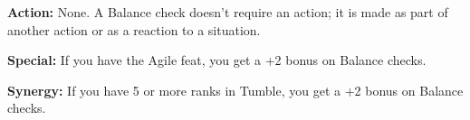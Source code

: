 \textbf{Action:} None. A Balance check doesn’t require an action; it is made as part of another action or as a reaction to a situation.

\textbf{Special:} If you have the Agile feat, you get a +2 bonus on Balance checks.

\textbf{Synergy:} If you have 5 or more ranks in Tumble, you get a +2 bonus on Balance checks.